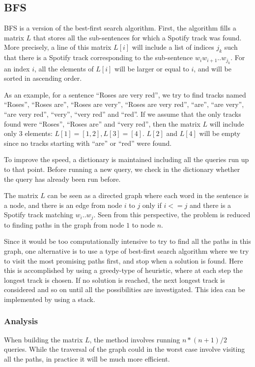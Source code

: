 \documentclass[12pt]{article}
\begin{document}
\subsection{BFS}
BFS is a version of the best-first search algorithm. First, the
algorithm fills a matrix $L$ that stores all the sub-sentences for
which a Spotify track was found. More precisely, a line of this matrix
$L[i]$ will include a list of indices $j_k$ such that there is a
Spotify track corresponding to the sub-sentence $w_i w_{i+1}
.. w_{j_k}$. For an index $i$, all the elements of $L[i]$ will be
larger or equal to $i$, and will be sorted in ascending order.

As an example, for a sentence ``Roses are very red'', we try to find
tracks named ``Roses'', ``Roses are'', ``Roses are very'', ``Roses are
very red'', ``are'', ``are very'', ``are very red'', ``very'', ``very
red'' and ``red''. If we assume that the only tracks found were
``Roses'', ``Roses are'' and ``very red'', then the matrix $L$ will
include only 3 elements: $L[1]=[1,2], L[3]=[4]$. $L[2]$ and $L[4]$
will be empty since no tracks starting with ``are'' or ``red'' were
found.

To improve the speed, a dictionary is maintained including all the
queries run up to that point. Before running a new query, we check in
the dictionary whether the query has already been run before.

The matrix $L$ can be seen as a directed graph where each word in the
sentence is a node, and there is an edge from node $i$ to $j$ only if
$i<=j$ and there is a Spotify track matching $w_i .. w_j$. Seen from
this perspective, the problem is reduced to finding paths in the graph
from node $1$ to node $n$.

Since it would be too computationally intensive to try to find all the
paths in this graph, one alternative is to use a type of best-first
search algorithm where we try to visit the most promising paths first,
and stop when a solution is found. Here this is accomplished by using
a greedy-type of heuristic, where at each step the longest track is
chosen. If no solution is reached, the next longest track is
considered and so on until all the possibilities are investigated.
This idea can be implemented by using a stack.

\subsubsection{Analysis}
When building the matrix $L$, the method involves running $n*(n+1)/2$
queries. While the traversal of the graph could in the worst case
involve visiting all the paths, in practice it will be much more
efficient.
\end{document}
